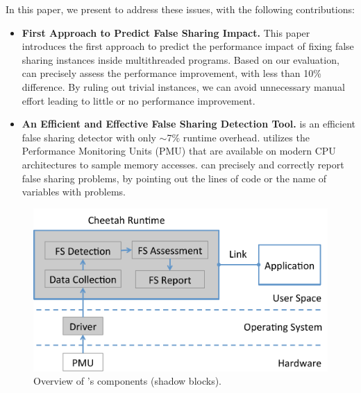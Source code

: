 In this paper, we present \cheetah{} to address these issues, with the following contributions:
\begin{itemize} 

\item {\bf First Approach to Predict False Sharing Impact.} This paper introduces the first approach to predict the performance impact of fixing false sharing instances inside multithreaded programs. Based on our evaluation, \cheetah{} can precisely assess the performance improvement, with less than 10\% difference. By ruling out trivial instances, we can avoid unnecessary manual effort leading to little or no performance improvement. 

\item {\bf An Efficient and Effective False Sharing Detection Tool.} \cheetah{} is an efficient false sharing detector with only $\sim$7\% runtime overhead. \Cheetah{} utilizes the Performance Monitoring Units (PMU) that are available on modern CPU architectures to sample memory accesses. \cheetah{} can precisely and correctly report false sharing problems, by pointing out the lines of code or the name of variables with problems. 
\end{itemize}

\begin{figure}[htbp]
\centering
\includegraphics[width=0.9\columnwidth]{figure/cheetahcomponents}
\caption{Overview of \cheetah{}'s components (shadow blocks).}
\label{fig:components}
\end{figure}



